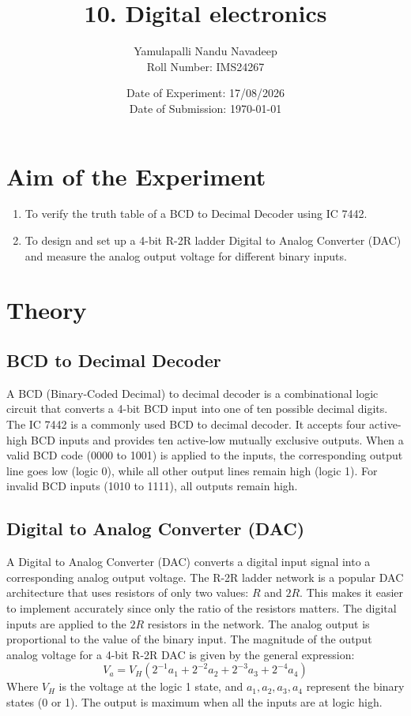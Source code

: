 \documentclass[12pt,a4paper]{article}
\title{\textbf{10. Digital electronics}}
\author{Yamulapalli Nandu Navadeep \\ Roll Number: IMS24267}
\date{Date of Experiment: 17/08/2026 \\ Date of Submission: \today}
\begin{document}
\maketitle

\section{Aim of the Experiment}
\begin{enumerate}
    \item To verify the truth table of a BCD to Decimal Decoder using IC 7442.
    \item To design and set up a 4-bit R-2R ladder Digital to Analog Converter (DAC) and measure the analog output voltage for different binary inputs.
\end{enumerate}

\section{Theory}
\subsection{BCD to Decimal Decoder}
A BCD (Binary-Coded Decimal) to decimal decoder is a combinational logic circuit that converts a 4-bit BCD input into one of ten possible decimal digits. The IC 7442 is a commonly used BCD to decimal decoder. It accepts four active-high BCD inputs and provides ten active-low mutually exclusive outputs. When a valid BCD code (0000 to 1001) is applied to the inputs, the corresponding output line goes low (logic 0), while all other output lines remain high (logic 1). For invalid BCD inputs (1010 to 1111), all outputs remain high.

\subsection{Digital to Analog Converter (DAC)}
A Digital to Analog Converter (DAC) converts a digital input signal into a corresponding analog output voltage. The R-2R ladder network is a popular DAC architecture that uses resistors of only two values: $R$ and $2R$. This makes it easier to implement accurately since only the ratio of the resistors matters. 
The digital inputs are applied to the $2R$ resistors in the network. The analog output is proportional to the value of the binary input. The magnitude of the output analog voltage for a 4-bit R-2R DAC is given by the general expression:
$$ V_a = V_H (2^{-1}a_1 + 2^{-2}a_2 + 2^{-3}a_3 + 2^{-4}a_4) $$
Where $V_H$ is the voltage at the logic 1 state, and $a_1, a_2, a_3, a_4$ represent the binary states (0 or 1). The output is maximum when all the inputs are at logic high.
\end{document}
